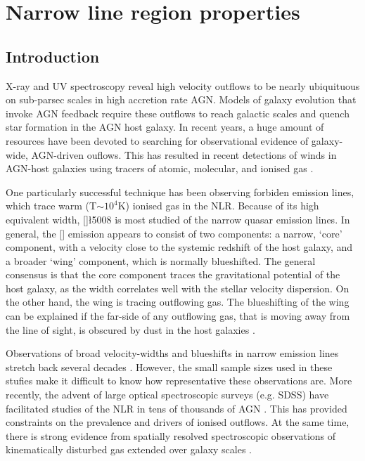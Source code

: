 
\chapter{Narrow line region properties}
\label{ch:nlr} 

\section{Introduction}

X-ray and \ac{UV} spectroscopy reveal high velocity outflows to be nearly ubiquituous on sub-parsec scales in high accretion rate \ac{AGN}.
Models of galaxy evolution that invoke \ac{AGN} feedback require these outflows to reach galactic scales and quench star formation in the \ac{AGN} host galaxy. 
In recent years, a huge amount of resources have been devoted to searching for observational evidence of galaxy-wide, \ac{AGN}-driven ouflows. 
This has resulted in recent detections of winds in \ac{AGN}-host galaxies using tracers of atomic, molecular, and ionised gas \citep[e.g.][]{nesvadba06,arav08,nesvadba08,moe09,dunn10,alexander10,harrison12,harrison14,nesvadba10,rupke13,veilleux13,nardini15,feruglio10,alatalo11,cimatti13,cicone14}.  

One particularly successful technique has been observing forbiden emission lines, which trace warm (T$\sim$$10^4$K) ionised gas in the \ac{NLR}. 
Because of its high equivalent width, []\l5008 is most studied of the narrow quasar emission lines. 
In general, the [] emission appears to consist of two components: a narrow, `core' component, with a velocity close to the systemic redshift of the host galaxy, and a broader `wing' component, which is normally blueshifted. 
The general consensus is that the core component traces the gravitational potential of the host galaxy, as the width correlates well with the stellar velocity dispersion. 
On the other hand, the wing is tracing outflowing gas. 
The blueshifting of the wing can be explained if the far-side of any outflowing gas, that is moving away from the line of sight, is obscured by dust in the host galaxies \citep[e.g.][]{heckman81,vrtilek85}. 

Observations of broad velocity-widths and blueshifts in narrow emission lines stretch back several decades \citep[e.g.][]{weedman70,stockton76,heckman81,veron81,feldman82,heckman84,vrtilek85,whittle85,boroson92}. 
However, the small sample sizes used in these stufies make it difficult to know how representative these observations are. 
More recently, the advent of large optical spectroscopic surveys (e.g. SDSS) have facilitated studies of the \ac{NLR} in tens of thousands of \ac{AGN} \citep[e.g.][]{boroson05,greene05a,zhang11,mullaney13,zakamska14,shen14}. 
This has provided constraints on the prevalence and drivers of ionised outflows.   
At the same time, there is strong evidence from spatially resolved spectroscopic observations of kinematically disturbed gas extended over galaxy scales \citep[e.g.][]{greene09,greene11,hainline13,harrison12,harrison14}. 

